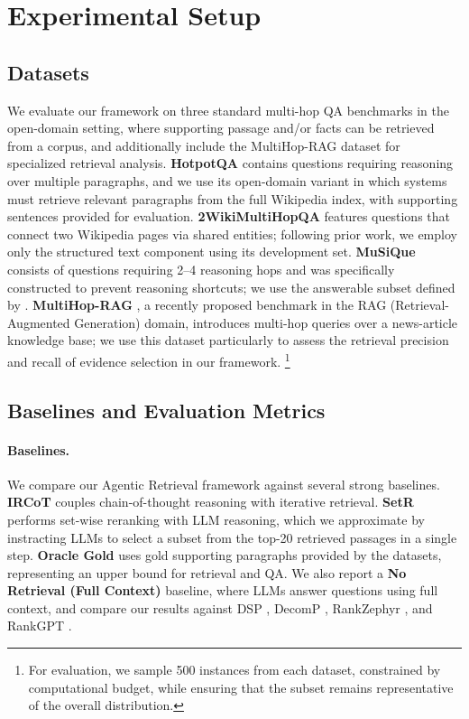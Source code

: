 \documentclass{article} %
\begin{document}
\section{Experimental Setup}

\subsection{Datasets}
We evaluate our framework on three standard multi-hop QA benchmarks in the open-domain setting, where supporting passage and/or facts can be retrieved from a corpus, and additionally include the MultiHop-RAG \citep{tang2024multihoprag} dataset for specialized retrieval analysis. \textbf{HotpotQA} \citep{yang2018hotpotqa} contains questions requiring reasoning over multiple paragraphs, and we use its open-domain variant in which systems must retrieve relevant paragraphs from the full Wikipedia index, with supporting sentences provided for evaluation. \textbf{2WikiMultiHopQA} \citep{ho2020constructing} features questions that connect two Wikipedia pages via shared entities; following prior work, we employ only the structured text component using its development set. \textbf{MuSiQue} \citep{trivedi2022musique} consists of questions requiring 2–4 reasoning hops and was specifically constructed to prevent reasoning shortcuts; we use the answerable subset defined by \citet{trivedi-etal-2023-interleaving}. \textbf{MultiHop-RAG} \citep{tang2024multihoprag}, a recently proposed benchmark in the RAG (Retrieval-Augmented Generation) domain, introduces multi-hop queries over a news-article knowledge base; we use this dataset particularly to assess the retrieval precision and recall of evidence selection in our framework. \footnote{For evaluation, we sample 500 instances from each dataset, constrained by computational budget, while ensuring that the subset remains representative of the overall distribution. }

\subsection{Baselines and Evaluation Metrics}
\paragraph{Baselines.}
We compare our Agentic Retrieval framework against several strong baselines. \textbf{IRCoT} \citep{trivedi-etal-2023-interleaving} couples chain-of-thought reasoning with iterative retrieval. \textbf{SetR} \citep{lee-etal-2025-shifting} performs set-wise reranking with LLM reasoning, which we approximate by instracting LLMs to select a subset from the top-20 retrieved passages in a single step. \textbf{Oracle Gold} uses gold supporting paragraphs provided by the datasets, representing an upper bound for retrieval and QA. We also report a \textbf{No Retrieval (Full Context)} baseline, where LLMs answer questions using full context, and compare our results against DSP  \citep{khattab2022demonstrate}, DecomP  \citep{khotdecomposed}, RankZephyr  \citep{pradeep2023rankzephyr}, and RankGPT  \citep{sun-etal-2023-chatgpt}. 
\end{document}
